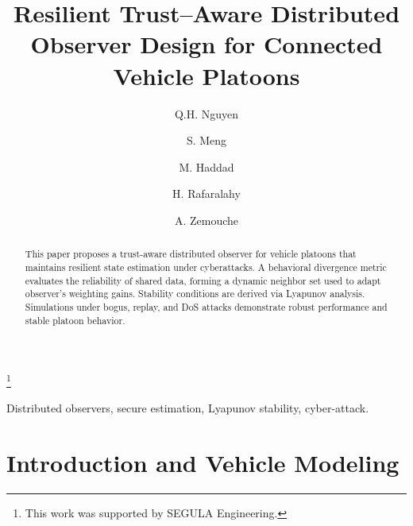\documentclass{ifacconf}
\begin{document}
\begin{frontmatter}

\title{Resilient Trust--Aware Distributed Observer Design for Connected Vehicle Platoons
}  

\thanks[footnoteinfo]{This work was supported by SEGULA Engineering.}

\author[First]{Q.H. Nguyen} 
\author[First]{S. Meng} 
\author[Second]{M. Haddad}
\author[First]{H. Rafaralahy}
\author[First]{A. Zemouche}

\address[First]{Universit\'e de Lorraine, CNRS, CRAN, F-57000 Metz (e-mail: quang-huy.nguyen@univ-lorraine.fr).}
\address[Second]{SEGULA Engineering, 19 rue d'Arras, 92000 Nanterre, France (e-mail: madjid.haddad@segula.fr)}

\begin{abstract}                %
This paper proposes a trust-aware distributed observer for vehicle platoons that maintains resilient state estimation under cyberattacks. 
A behavioral divergence metric evaluates the reliability of shared data, forming a dynamic neighbor set used to adapt observer's weighting gains. 
Stability conditions are derived via Lyapunov analysis. 
Simulations under bogus, replay, and DoS attacks demonstrate robust performance and stable platoon behavior.
\end{abstract}

\begin{keyword}
Distributed observers, secure estimation, Lyapunov stability, cyber-attack.
\end{keyword}

\end{frontmatter}



\section{Introduction and Vehicle Modeling}\label{sec_introduction}
\end{document}
